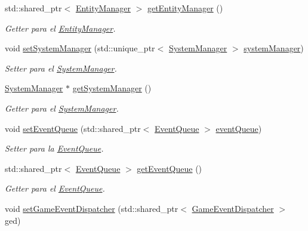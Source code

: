 \begin{DoxyCompactItemize}
std\+::shared\+\_\+ptr$<$ \hyperlink{classant_1_1_entity_manager}{Entity\+Manager} $>$ \hyperlink{classant_1_1_world_af9af0d31f2b1ed8519f90b50cea1ff6b}{get\+Entity\+Manager} ()
\begin{DoxyCompactList}\small\item\em Getter para el \hyperlink{classant_1_1_entity_manager}{Entity\+Manager}. \end{DoxyCompactList}\item 
void \hyperlink{classant_1_1_world_a659a2c032a712ed68863c1680c9b4512}{set\+System\+Manager} (std\+::unique\+\_\+ptr$<$ \hyperlink{classant_1_1_system_manager}{System\+Manager} $>$ \hyperlink{classant_1_1_world_afa36ceca0aa8d3ce8e19d6e542fe767e}{system\+Manager})
\begin{DoxyCompactList}\small\item\em Setter para el \hyperlink{classant_1_1_system_manager}{System\+Manager}. \end{DoxyCompactList}\item 
\hyperlink{classant_1_1_system_manager}{System\+Manager} $\ast$ \hyperlink{classant_1_1_world_a4986fb2c93944029318ced86fac6698d}{get\+System\+Manager} ()
\begin{DoxyCompactList}\small\item\em Getter para el \hyperlink{classant_1_1_system_manager}{System\+Manager}. \end{DoxyCompactList}\item 
void \hyperlink{classant_1_1_world_a830700b10f9f4eb08039fbfb325d7876}{set\+Event\+Queue} (std\+::shared\+\_\+ptr$<$ \hyperlink{classant_1_1_event_queue}{Event\+Queue} $>$ \hyperlink{classant_1_1_world_ab9634a4cf143a86701367438a989d277}{event\+Queue})
\begin{DoxyCompactList}\small\item\em Setter para la \hyperlink{classant_1_1_event_queue}{Event\+Queue}. \end{DoxyCompactList}\item 
std\+::shared\+\_\+ptr$<$ \hyperlink{classant_1_1_event_queue}{Event\+Queue} $>$ \hyperlink{classant_1_1_world_a9ed45a179bf0f7de1a6ae72ea55b39e0}{get\+Event\+Queue} ()
\begin{DoxyCompactList}\small\item\em Getter para el \hyperlink{classant_1_1_event_queue}{Event\+Queue}. \end{DoxyCompactList}\item 
void \hyperlink{classant_1_1_world_ab4ec098618644c0027dc07b7ad85ae1f}{set\+Game\+Event\+Dispatcher} (std\+::shared\+\_\+ptr$<$ \hyperlink{classant_1_1_game_event_dispatcher}{Game\+Event\+Dispatcher} $>$ ged)

\end{DoxyCompactItemize}
